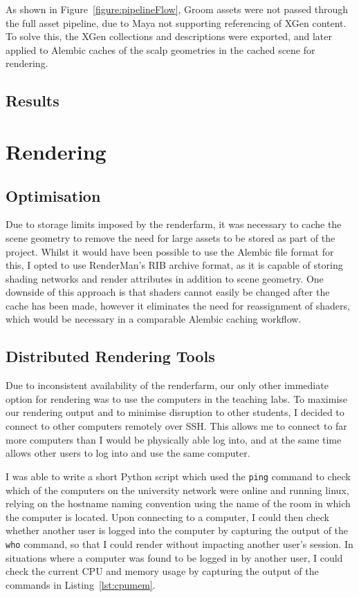 \documentclass[11pt]{article}
\begin{document}
As shown in Figure~\ref{figure:pipelineFlow}, Groom assets were not passed through the full asset pipeline, due to Maya not supporting referencing of XGen content. To solve this, the XGen collections and descriptions were exported, and later applied to Alembic caches of the scalp geometries in the cached scene for rendering.

\subsection{Results}


\section{Rendering}


\subsection{Optimisation}

Due to storage limits imposed by the renderfarm, it was necessary to cache the scene geometry to remove the need for large assets to be stored as part of the project. Whilst it would have been possible to use the Alembic file format for this, I opted to use RenderMan's RIB archive format, as it is capable of storing shading networks and render attributes in addition to scene geometry. One downside of this approach is that shaders cannot easily be changed after the cache has been made, however it eliminates the need for reassignment of shaders, which would be necessary in a comparable Alembic caching workflow.

\subsection{Distributed Rendering Tools}

Due to inconsistent availability of the renderfarm, our only other immediate option for rendering was to use the computers in the teaching labs. To maximise our rendering output and to minimise disruption to other students, I decided to connect to other computers remotely over SSH. This allows me to connect to far more computers than I would be physically able log into, and at the same time allows other users to log into and use the same computer.

I was able to write a short Python script which used the \texttt{ping} command to check which of the computers on the university network were online and running linux, relying on the hostname naming convention using the name of the room in which the computer is located. Upon connecting to a computer, I could then check whether another user is logged into the computer by capturing the output of the \texttt{who} command, so that I could render without impacting another user's session. In situations where a computer was found to be logged in by another user, I could check the current CPU and memory usage by capturing the output of the commands in Listing~\ref{lst:cpumem}.
\end{document}
